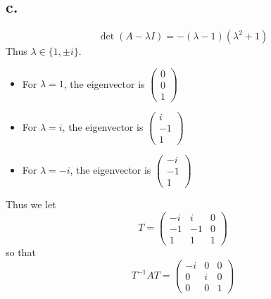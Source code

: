 \documentclass[11pt]{article}
\theoremstyle{mystyle}
\theoremstyle{definition}
\begin{document}
\subsection*{c.}
\[
  \det(A - \lambda I) = -(\lambda - 1)(\lambda^2 + 1)
\]
Thus $\lambda \in \{1, \pm i\}$. 
\begin{itemize}
  \item For $\lambda = 1$, the eigenvector is 
    $\begin{pmatrix}
    0 \\ 0 \\ 1 
    \end{pmatrix}$
  \item For $\lambda = i$, the eigenvector is 
    $\begin{pmatrix}
    i \\ -1 \\ 1 
    \end{pmatrix}$
  \item For $\lambda = -i$, the eigenvector is 
    $\begin{pmatrix}
    -i \\ -1 \\ 1 
    \end{pmatrix}$
\end{itemize}
Thus we let 
\[
  T = 
  \begin{pmatrix}
    -i & i & 0 \\
    -1 & -1 & 0 \\
    1 & 1 & 1
  \end{pmatrix}
\]
so that 
\[
  T^{-1} A T = 
  \begin{pmatrix}
    -i & 0 & 0 \\
    0 & i & 0 \\
    0 & 0 & 1
  \end{pmatrix}
\]
\end{document}
